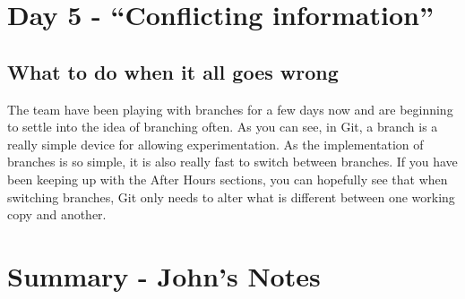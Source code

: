 \section{Day 5 - ``Conflicting information''}
\subsection{What to do when it all goes wrong}

The team have been playing with branches for a few days now and are beginning to settle into the idea of branching often.  As you can see, in Git, a branch is a really simple device for allowing experimentation.  As the implementation of branches is so simple, it is also really fast to switch between branches.  If you have been keeping up with the After Hours sections, you can hopefully see that when switching branches, Git only needs to alter what is different between one working copy and another.

\clearpage

\section{Summary - John's Notes}
